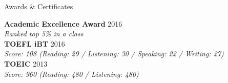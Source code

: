 \documentclass{resume} %
\begin{document}

\begin{rSection}{Awards \& Certificates}

{\bf Academic Excellence Award} \hfill {2016} \\
{\em Ranked top 5\% in a class} \\
{\bf TOEFL iBT} \hfill {2016} \\
{\em Score: 108 (Reading: 29 / Listening: 30 / Speaking: 22 / Writing: 27)} \\
{\bf TOEIC} \hfill {2013} \\
{\em Score: 960 (Reading: 480 / Listening: 480)}

\end{rSection}





\end{document}
